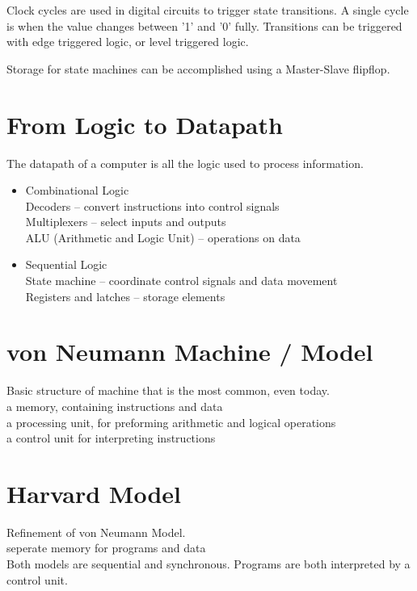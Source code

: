 \documentclass{article}
\begin{document}
Clock cycles are used in digital circuits to trigger state transitions. A single cycle is when the value changes between '1' and '0' fully. Transitions can be triggered with edge triggered logic, or level triggered logic.

Storage for state machines can be accomplished using a Master-Slave flipflop.

\section{From Logic to Datapath}
The datapath of a computer is all the logic used to process information.
\begin{itemize}
  \item Combinational Logic\\
  Decoders -- convert instructions into control signals\\
  Multiplexers -- select inputs and outputs\\
  ALU (Arithmetic and Logic Unit) -- operations on data\\
  \item Sequential Logic\\
  State machine -- coordinate control signals and data movement\\
  Registers and latches -- storage elements\\
\end{itemize}

\section{von Neumann Machine / Model}
Basic structure of machine that is the most common, even today.\\
a memory, containing instructions and data\\
a processing unit, for preforming arithmetic and logical operations\\
a control unit for interpreting instructions\\

\section{Harvard Model}
Refinement of von Neumann Model.\\
seperate memory for programs and data\\

Both models are sequential and synchronous. Programs are both interpreted by a control unit.
\end{document}
